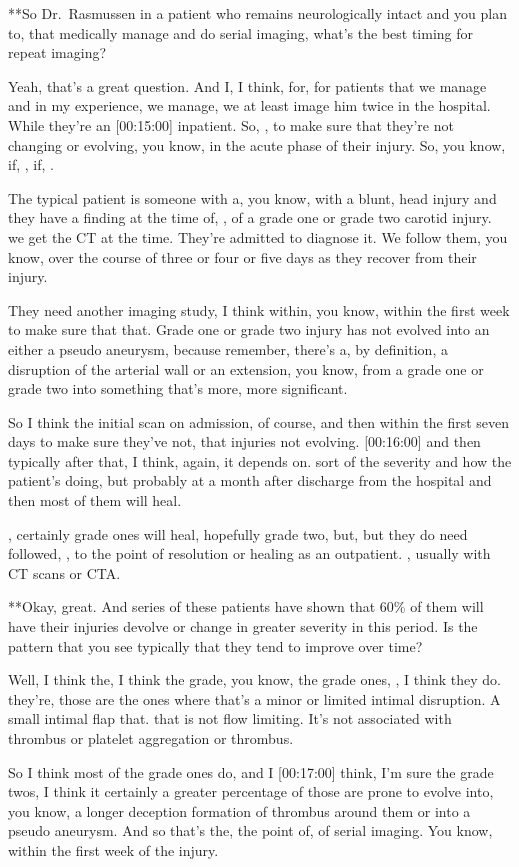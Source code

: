 \documentclass[
]{book}
\begin{document}
**So Dr.~Rasmussen in a patient
who remains neurologically intact and you plan to, that medically
manage and do serial imaging, what's the best timing for repeat imaging?

Yeah, that's
a great question. And I, I think, for, for patients that we
manage and in my experience, we manage, we at least image him twice in
the hospital. While they're an {[}00:15:00{]} inpatient. So, , to make sure
that they're not changing or evolving, you know, in the acute phase of
their injury. So, you know, if, , if, .

The typical patient is someone with a, you know, with a blunt, head
injury and they have a finding at the time of, , of a grade one or grade
two carotid injury. we get the CT at the time. They're admitted to
diagnose it. We follow them, you know, over the course of three or four
or five days as they recover from their injury.

They need another imaging study, I think within, you know, within the
first week to make sure that that. Grade one or grade two injury has not
evolved into an either a pseudo aneurysm, because remember, there's a,
by definition, a disruption of the arterial wall or an extension, you
know, from a grade one or grade two into something that's more, more
significant.

So I think the initial scan on admission, of course, and then within the
first seven days to make sure they've not, that injuries not evolving.
{[}00:16:00{]} and then typically after that, I think, again, it depends
on. sort of the severity and how the patient's doing, but probably
at a month after discharge from the hospital and then most of them will
heal.

, certainly grade ones will heal, hopefully grade two, but, but they do
need followed, , to the point of resolution or healing as an outpatient.
, usually with CT scans or CTA.

**Okay, great. And series of
these patients have shown that 60\% of them will have their injuries
devolve or change in greater severity in this period. Is the pattern
that you see typically that they tend to improve over time?

Well, I think
the, I think the grade, you know, the grade ones, , I think they do.
they're, those are the ones where that's a minor or limited intimal
disruption. A small intimal flap that. that is not flow limiting. It's
not associated with thrombus or platelet aggregation or thrombus.

So I think most of the grade ones do, and I {[}00:17:00{]} think, I'm sure
the grade twos, I think it certainly a greater percentage of those are
prone to evolve into, you know, a longer deception formation of thrombus
around them or into a pseudo aneurysm. And so that's the, the point of,
of serial imaging. You know, within the first week of the injury.
\end{document}
